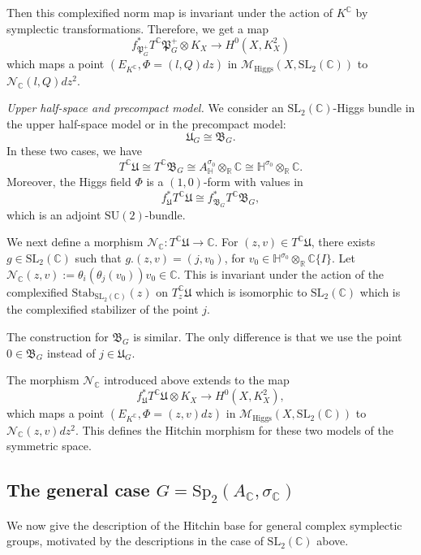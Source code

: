 \documentclass[oneside,11pt]{amsart}
\theoremstyle{definition}
\theoremstyle{remark}
\numberwithin{thm}{section}
\numberwithin{equation}{section}
\begin{document}
Then this complexified norm map is invariant under the action of $K^{\mathbb{C}}$ by symplectic transformations. Therefore, we get a map
\[
f^{*}_{\mathfrak{P}_G^+}T^{\mathbb{C}}\mathfrak{P}_G^+ \otimes K_X \to H^0(X, K^2_X)\]
which maps a point $(E_{K^{\mathbb{C}}}, \Phi=(l,Q)dz)$ in $\mathcal{M}_{\mathrm{Higgs}}(X,\mathrm{SL}_2(\mathbb{C}))$ to $\mathcal N_\mathbb C(l,Q) dz^2$. 

\vspace{2mm}

\noindent \textit{Upper half-space and precompact model.} We consider an $\mathrm{SL}_2( \mathbb{C})$-Higgs bundle in the upper half-space model or in the precompact model:
\[\mathfrak{U}_G \cong  \mathfrak{B}_G.\]
In these two cases, we have 
\[T^{\mathbb{C}}\mathfrak{U} \cong  T^{\mathbb{C}}\mathfrak{B}_G \cong  A_{\mathbb{H}}^{\sigma_0} \otimes_{\mathbb{R}} \mathbb{C} \cong  \mathbb{H}^{\sigma_0} \otimes_{\mathbb{R}} \mathbb{C}.\]
Moreover, the Higgs field $\Phi$ is a $(1,0)$-form with values in 
\[f^{*}_{\mathfrak{U}}T^{\mathbb{C}}\mathfrak{U} \cong  f^{*}_{\mathfrak{B}_G}T^{\mathbb{C}}\mathfrak{B}_G,\]
which is an adjoint $\mathrm{SU}(2)$-bundle.

We next define a morphism $\mathcal N_\mathbb C\colon T^{\mathbb{C}}\mathfrak{U}\to \mathbb C$. For $(z,v)\in T^{\mathbb{C}}\mathfrak{U}$, there exists $g\in\mathrm{SL}_2(\mathbb C)$ such that $g.(z,v)= (j,v_0)$, for $v_0\in \mathbb{H}^{\sigma_0} \otimes_{\mathbb{R}} \mathbb{C}\{I\}$. Let $\mathcal N_\mathbb C(z,v):=\theta_i(\theta_j(v_0))v_0\in\mathbb C$. This is invariant under the action of the complexified 
$\mathrm{Stab}_{\mathrm{SL}_2(\mathbb C)}(z)$ on $T_z^{\mathbb{C}}\mathfrak{U}$ which is isomorphic to $\mathrm{SL}_2(\mathbb C)$ which is the complexified stabilizer of the point $j$.

The construction for $\mathfrak{B}_G$ is similar. The only difference is that we use the point $0\in\mathfrak{B}_G$ instead of $j\in\mathfrak{U}_G$.

The morphism $\mathcal N_\mathbb C$ introduced above extends to the map 
\[f^{*}_{\mathfrak{U}}T^{\mathbb{C}}\mathfrak{U} \otimes K_X \to H^0(X, K^2_X),\]
which maps a point $(E_{K^{\mathbb{C}}}, \Phi=(z,v)dz)$ in $\mathcal{M}_{\mathrm{Higgs}}(X,\mathrm{SL}_2(\mathbb{C}))$ to $\mathcal N_\mathbb C(z,v) dz^2$. This defines the Hitchin morphism for these two models of the symmetric space. 


\subsection{The general case \texorpdfstring{$G=\mathrm{Sp}_2(A_{\mathbb{C}}, \sigma_{\mathbb{C}})$}{}}\label{sec:Hitchin_morphism_Sp_general}
We now give the description of the Hitchin base for general complex symplectic groups, motivated by the descriptions in the case of $\mathrm{SL}_2( \mathbb{C})$ above. 
\end{document}
